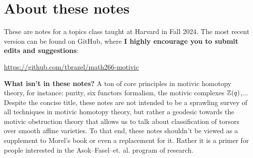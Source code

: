 \documentclass[11pt,openany]{book}
\begin{document}
\dominitoc

\maketitle

\setcounter{tocdepth}{1}

\setcounter{minitocdepth}{2}


\tableofcontents{}
 

\setlength{\parskip}{0.2em}

\setcounter{section}{-1}

\section*{About these notes}

These are notes for a topics class taught at Harvard in Fall 2024. The most recent version can be found on GitHub, where \textbf{I highly encourage you to submit edits and suggestions}:
\begin{center}
    \href{https://github.com/tbrazel/math266-motivic}{https://github.com/tbrazel/math266-motivic}
\end{center}

\textbf{What isn't in these notes?} A ton of core principles in motivic homotopy theory, for instance: purity, six functors formalism, the motivic complexes $\mathbb{Z}(q)$,... Despite the concise title, these notes are not intended to be a sprawling survey of all techniques in motivic homotopy theory, but rather a geodesic towards the motivic obstruction theory that allows us to talk about classification of torsors over smooth affine varieties. To that end, these notes shouldn't be viewed as a supplement to Morel's book or even a replacement for it. Rather it is a primer for people interested in the Asok--Fasel--et. al. program of research.
\end{document}
